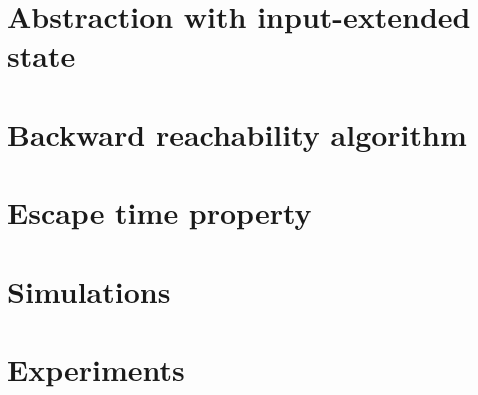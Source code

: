 \documentclass[electronic]{kthesis}
\newcommand{\vect}[1]{\ensuremath{ \mathbf{#1}}}
\theoremstyle{named}
\begin{document}


\chapter{Abstraction with input-extended state}




%
\chapter{Backward reachability algorithm}

%
\chapter{Escape time property}

%
%
\chapter{Simulations}

\newcommand{\um}{\u_{-}}
\newcommand{\up}{\u_{+}}
\newcommand{\uo}{\vect{0}}






\chapter{Experiments}




%

{}
\end{document}
